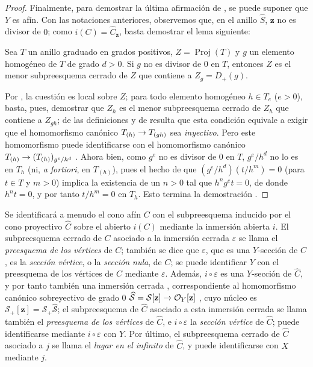\documentclass[oneside,10pt]{amsart}
\makeatletter
\newcommand{\ega@arrow}[2]{\mathchoice{#1}{#2}{#2}{#2}}
\renewcommand{\to}{\ega@arrow{\longrightarrow}{\rightarrow}}
\let\EGAOriginalLabel\label
\renewcommand{\label}[1]{\phantomsection\EGAOriginalLabel{#1}}
\makeatother
\begin{document}
\begin{proof}
Finalmente, para demostrar la última afirmación de , se puede suponer que $Y$ es afín.
Con las notaciones anteriores, observemos que, en el anillo $\widehat{S}$, $\mathbf{z}$ no es divisor de $0$;
como $i(C)=\widehat{C}_{\mathbf{z}}$, basta demostrar el lema siguiente:
\begin{lemma}[8.3.2.7]
\label{II.8.3.2.7-fr}
Sea $T$ un anillo graduado en grados positivos, $Z=\operatorname{Proj}(T)$ y $g$ un elemento homogéneo de $T$ de grado $d>0$.
Si $g$ no es divisor de $0$ en $T$, entonces $Z$ es el menor subpreesquema cerrado de $Z$ que contiene a $Z_g=D_+(g)$.
\end{lemma}

Por , la cuestión es local sobre $Z$;
para todo elemento homogéneo $h\in T_e$ ($e>0$), basta, pues, demostrar que $Z_h$ es el menor subpreesquema cerrado de $Z_h$ que contiene a $Z_{gh}$;
de las definiciones y de  resulta que esta condición equivale a exigir que el homomorfismo canónico $T_{(h)}\to T_{(gh)}$ sea \emph{inyectivo}.
Pero este homomorfismo puede identificarse con el homomorfismo canónico $T_{(h)}\to(T_{(h)})_{g^e/h^d}$ .
Ahora bien, como $g^e$ no es divisor de $0$ en $T$, $g^e/h^d$ no lo es en $T_h$ (ni, \emph{a fortiori}, en $T_{(h)}$), pues el hecho de que $(g^e/h^d)(t/h^m)=0$ (para $t\in T$ y $m>0$) implica la existencia de un $n>0$ tal que $h^ng^et=0$, de donde $h^nt=0$, y por tanto $t/h^m=0$ en $T_h$.
Esto termina la demostración .
\end{proof}
\begin{env}[8.3.3]
\label{II.8.3.3-fr}
Se identificará a menudo el cono afín $C$ con el subpreesquema inducido por el cono proyectivo $\widehat{C}$ sobre el abierto $i(C)$ mediante la inmersión abierta $i$.
El subpreesquema cerrado de $C$ asociado a la inmersión cerrada $\varepsilon$ se llama el \emph{preesquema de los vértices} de $C$;
también se dice que $\varepsilon$, que es una $Y$-sección de $C$, es la \emph{sección vértice}, o la \emph{sección nula}, de $C$;
se puede identificar $Y$ con el preesquema de los vértices de $C$ mediante $\varepsilon$.
Además, $i\circ\varepsilon$ es una $Y$-sección de $\widehat{C}$, y por tanto también una inmersión cerrada , correspondiente al homomorfismo canónico sobreyectivo de grado $0$ $\widehat{\mathcal{S}}=\mathcal{S}[\mathbf{z}]\to\mathcal{O}_Y[\mathbf{z}]$ , cuyo núcleo es $\mathcal{S}_+[\mathbf{z}]=\mathcal{S}_+\widehat{\mathcal{S}}$;
el subpreesquema de $\widehat{C}$ asociado a esta inmersión cerrada se llama también el \emph{preesquema de los vértices} de $\widehat{C}$, e $i\circ\varepsilon$ la \emph{sección vértice} de $\widehat{C}$;
puede identificarse mediante $i\circ\varepsilon$ con $Y$.
Por último, el subpreesquema cerrado de $\widehat{C}$ asociado a $j$ se llama el \emph{lugar en el infinito} de $\widehat{C}$, y puede identificarse con $X$ mediante $j$.
\end{env}
\end{document}
